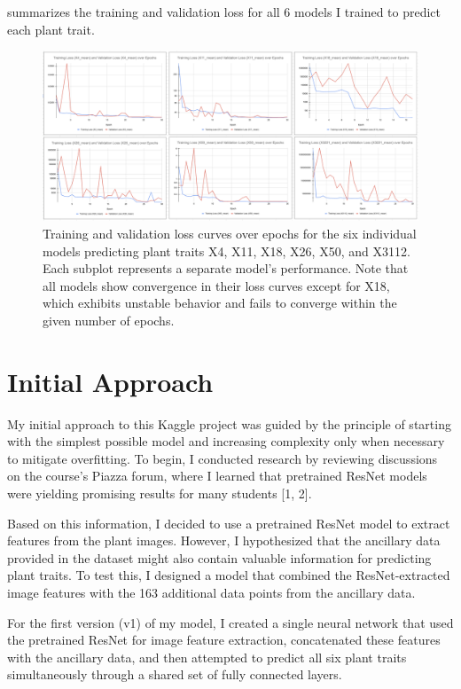 \documentclass{article}
\begin{document}
 summarizes the training and validation loss for all 6 models I trained to predict each plant trait.

\begin{figure}[h]
\centering
\includegraphics[width=1.0 \textwidth]{1_allLosses.png}
\caption{Training and validation loss curves over epochs for the six individual models predicting plant traits X4, X11, X18, X26, X50, and X3112. Each subplot represents a separate model's performance. Note that all models show convergence in their loss curves except for X18, which exhibits unstable behavior and fails to converge within the given number of epochs.}
\label{fig:trait_model_losses}
\end{figure}

\section{Initial Approach}

My initial approach to this Kaggle project was guided by the principle of starting with the simplest possible model and increasing complexity only when necessary to mitigate overfitting. To begin, I conducted research by reviewing discussions on the course's Piazza forum, where I learned that pretrained ResNet models were yielding promising results for many students [1, 2]. 

Based on this information, I decided to use a pretrained ResNet model to extract features from the plant images. However, I hypothesized that the ancillary data provided in the dataset might also contain valuable information for predicting plant traits. To test this, I designed a model that combined the ResNet-extracted image features with the 163 additional data points from the ancillary data.

For the first version (v1) of my model, I created a single neural network that used the pretrained ResNet for image feature extraction, concatenated these features with the ancillary data, and then attempted to predict all six plant traits simultaneously through a shared set of fully connected layers. 
\end{document}
